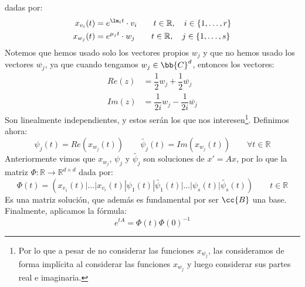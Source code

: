 dadas por:
\begin{align*}
    x_{v_i}(t) &= e^{\lm_i t} \cdot v_i \qquad t\in \mathbb{R}, \quad  i \in \{1,\ldots,r\} \\
    x_{w_j}(t) &= e^{\mu_j t}\cdot w_j \qquad t\in \mathbb{R},\quad  j\in \{1,\ldots,s\}
\end{align*}
Notemos que hemos usado solo los vectores propios $w_j$ y que no hemos usado los vectores $\overline{w_j}$, ya que cuando tengamos $w_j\in \bb{C}^d$, entonces los vectores:
\begin{align*}
    Re(z) &= \dfrac{1}{2}w_j + \dfrac{1}{2}\overline{w_j} \\
    Im(z) &= \dfrac{1}{2i}w_j - \dfrac{1}{2i} \overline{w_j}
\end{align*}
Son linealmente independientes, y estos serán los que nos interesen\footnote{Por lo que a pesar de no considerar las funciones $x_{\overline{w_j}}$, las consideramos de forma implícita al considerar las funciones $x_{w_j}$ y luego considerar sus partes real e imaginaria.}. Definimos ahora:
\begin{equation*}
    \psi_j(t) = Re(x_{w_j}(t)) \qquad \tilde{\psi_j}(t) = Im(x_{w_j}(t)) \qquad \forall t\in \mathbb{R}
\end{equation*}
Anteriormente vimos que $x_{w_j}$, $\psi_j$ y $\tilde{\psi_j}$ son soluciones de $x'=Ax$, por lo que la matriz $\Phi:\mathbb{R}\rightarrow\mathbb{R}^{d\times d}$ dada por:
\begin{equation*}
    \Phi(t) = \left(x_{v_1}(t)|\ldots|x_{v_r}(t)|\psi_1(t)|\tilde{\psi_1}(t)|\ldots|\psi_s(t)|\tilde{\psi_s}(t)\right) \qquad t\in \mathbb{R}
\end{equation*}
Es una matriz solución, que además es fundamental por ser $\cc{B}$ una base. Finalmente, aplicamos la fórmula:
\begin{equation*}
    e^{tA} = \Phi(t)\Phi(0)^{-1}
\end{equation*}

